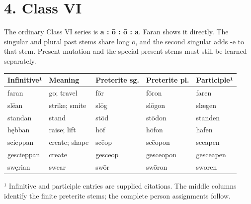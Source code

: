 \section*{4. Class VI}

The ordinary Class VI series is \textbf{a : ō : ō : a}. Faran shows it directly. The singular and plural past stems share long ō, and the second singular adds -e to that stem. Present mutation and the special present stems must still be learned separately.

\par\begingroup
\fontsize{10.5}{13.2}\selectfont
\setlength{\LTleft}{0pt}\setlength{\LTright}{\fill}
\noindent
\begin{tabular}{@{}>{\raggedright\arraybackslash}p{23.14mm}>{\raggedright\arraybackslash}p{21.04mm}>{\raggedright\arraybackslash}p{22.72mm}>{\raggedright\arraybackslash}p{22.72mm}>{\raggedright\arraybackslash}p{23.14mm}@{}}
\toprule
\textbf{Infinitive¹} & \textbf{Meaning} & \textbf{Preterite sg.} & \textbf{Preterite pl.} & \textbf{Participle¹} \\
\midrule
faran & go; travel & fōr & fōron & faren \\
slēan & strike; smite & slōg & slōgon & slægen \\
standan & stand & stōd & stōdon & standen \\
hębban & raise; lift & hōf & hōfon & hafen \\
scieppan & create; shape & scēop & scēopon & sceapen \\
gescieppan & create & gescēop & gescēopon & gesceapen \\
swęrian & swear & swōr & swōron & sworen \\
\bottomrule
\end{tabular}
\par\endgroup

¹ Infinitive and participle entries are supplied citations. The middle columns identify the finite preterite stems; the complete person assignments follow.

